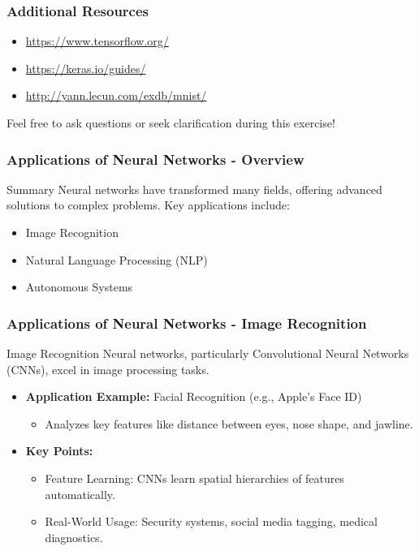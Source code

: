 \documentclass[aspectratio=169]{beamer}
\begin{document}
\begin{frame}
    \frametitle{Additional Resources}
    \begin{itemize}
        \item \url{https://www.tensorflow.org/} 
        \item \url{https://keras.io/guides/} 
        \item \url{http://yann.lecun.com/exdb/mnist/} 
    \end{itemize}
    Feel free to ask questions or seek clarification during this exercise!
\end{frame}

\begin{frame}[fragile]
    \frametitle{Applications of Neural Networks - Overview}
    \begin{block}{Summary}
        Neural networks have transformed many fields, offering advanced solutions to complex problems. Key applications include:
    \end{block}
    \begin{itemize}
        \item Image Recognition
        \item Natural Language Processing (NLP)
        \item Autonomous Systems
    \end{itemize}
\end{frame}

\begin{frame}[fragile]
    \frametitle{Applications of Neural Networks - Image Recognition}
    \begin{block}{Image Recognition}
        Neural networks, particularly Convolutional Neural Networks (CNNs), excel in image processing tasks. 
    \end{block}
    \begin{itemize}
        \item \textbf{Application Example:} Facial Recognition (e.g., Apple’s Face ID)
        \begin{itemize}
            \item Analyzes key features like distance between eyes, nose shape, and jawline.
        \end{itemize}
        \item \textbf{Key Points:}
        \begin{itemize}
            \item Feature Learning: CNNs learn spatial hierarchies of features automatically.
            \item Real-World Usage: Security systems, social media tagging, medical diagnostics.
        \end{itemize}
    \end{itemize}
\end{frame}
\end{document}
